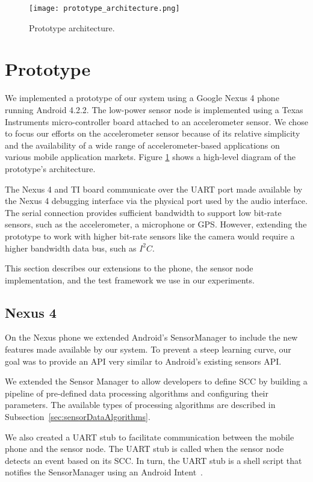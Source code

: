 
\begin{figure}[t]
	\centering
	\texttt{[image: prototype\_architecture.png]}
	\caption{Prototype architecture.}
    \label{fig:prototypeArchitecture}
\end{figure}

\section{Prototype}
\label{sec:prototype}

We implemented a prototype of our system using a Google Nexus 4 phone
running Android 4.2.2.  The low-power sensor node is implemented using
a Texas Instruments micro-controller board attached to an
accelerometer sensor.  We chose to focus our efforts on the
accelerometer sensor because of its relative simplicity and the
availability of a wide range of accelerometer-based applications on
various mobile application markets.  Figure
\ref{fig:prototypeArchitecture} shows a high-level diagram of the
prototype's architecture.

The Nexus 4 and TI board communicate over the UART port made available
by the Nexus 4 debugging interface via the physical port used by the
audio interface.  The serial connection provides sufficient bandwidth
to support low bit-rate sensors, such as the accelerometer, a
microphone or GPS.  However, extending the prototype to work with
higher bit-rate sensors like the camera would require a higher
bandwidth data bus, such as $I^2C$.

This section describes our extensions to the phone, the
sensor node implementation, and the test
framework we use in our experiments.

\subsection{Nexus 4}
\label{subsec:nexus}

On the Nexus phone we extended Android's SensorManager to include the
new features made available by our system. To prevent a steep learning
curve, our goal was to provide an API very similar to Android's
existing sensors API.  

We extended the Sensor Manager to allow developers to define SCC by building
a pipeline of pre-defined data processing algorithms and configuring their
parameters. The available types of processing algorithms are
described in Subsection~\ref{sec:sensorDataAlgorithms}.

We also created a UART stub to facilitate communication between the
mobile phone and the sensor node. The UART stub is called when
the sensor node detects an event based on its SCC.
In turn, the UART stub is a shell script that notifies the
SensorManager using an Android Intent~\cite{androidintents}.

